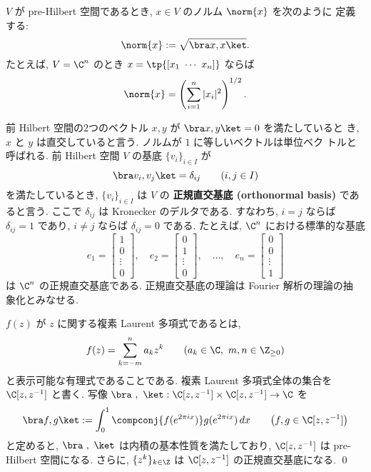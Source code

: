 \documentclass[12pt,twoside]{jarticle}
\begin{document}
$V$ が pre-Hilbert 空間であるとき, $x\in V$ のノルム $\norm{x}$ を次のように
定義する:
\begin{equation*}
  \norm{x} := \sqrt{\bra x, x \ket}.
\end{equation*}
たとえば, $V=\C^n$ のとき $x = \tp{[x_1\ \cdots\ x_n]}$ ならば
\begin{equation*}
  \norm{x} = \left(\sum_{i=1}^n|x_i|^2\right)^{1/2}.
\end{equation*}

前 Hilbert 空間の2つのベクトル $x,y$ が $\bra x, y\ket = 0$ を満たしていると
き, $x$ と $y$ は直交していると言う. ノルムが $1$ に等しいベクトルは単位ベク
トルと呼ばれる. 前 Hilbert 空間 $V$ の基底 $\{v_i\}_{i\in I}$ が
\begin{equation*}
  \bra v_i, v_j \ket = \delta_{ij} \qquad (i,j\in I)
\end{equation*}
を満たしているとき,  $\{v_i\}_{i\in I}$ は $V$ の
{\bf 正規直交基底 (orthonormal basis)} であると言う.
ここで $\delta_{ij}$ は Kronecker のデルタである.
すなわち, $i=j$ ならば $\delta_{ij}=1$ であり, 
$i\ne j$ ならば $\delta_{ij}=0$ である.
たとえば, $\C^n$ における標準的な基底
\begin{equation*}
  e_1 =
  \begin{bmatrix}
    1 \\ 0 \\ \vdots \\ 0
  \end{bmatrix},
  \quad
  e_2 =
  \begin{bmatrix}
    0 \\ 1 \\ \vdots \\ 0
  \end{bmatrix},
  \quad
  \dots,
  \quad
  e_n =
  \begin{bmatrix}
    0 \\ 0 \\ \vdots \\ 1
  \end{bmatrix}
\end{equation*}
は $\C^n$ の正規直交基底である.  正規直交基底の理論は Fourier 解析の理論の抽
象化とみなせる.


\begin{question}[10点]
  $f(z)$ が $z$ に関する複素 Laurent 多項式であるとは,
  \begin{equation*}
    f(z) = \sum_{k=-m}^n a_k z^k
    \qquad (a_k\in\C,\ m,n\in\Z_{\ge0})
  \end{equation*}
  と表示可能な有理式であることである. 
  複素 Laurent 多項式全体の集合を $\C[z,z^{-1}]$ と書く. 
  写像 $\bra\ ,\ \ket : \C[z,z^{-1}]\times\C[z,z^{-1}]\to\C$ を
  \begin{equation*}
    \bra f, g\ket 
    := \int_0^1 \compconj{f(e^{2\pi i x})} g(e^{2\pi i x})\,dx
    \qquad \bigl(f,g\in\C[z,z^{-1}]\bigr)
  \end{equation*}
  と定めると, $\bra\ ,\ \ket$ は内積の基本性質を満たしており, 
  $\C[z,z^{-1}]$ は pre-Hilbert 空間になる. 
  さらに, $\{z^k\}_{k\in\Z}$ は $\C[z,z^{-1}]$ の正規直交基底になる.
  \qed
\end{question}
\end{document}
